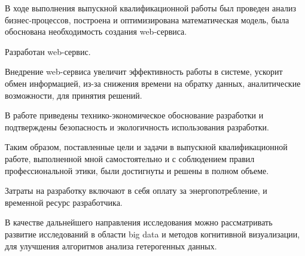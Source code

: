 В ходе выполнения выпускной квалификационной работы был проведен анализ бизнес-процессов, построена и оптимизирована математическая модель, была обоснована необходимость создания web-сервиса.

Разработан web-сервис.

Внедрение web-сервиса увеличит эффективность работы в системе, ускорит обмен информацией, из-за снижения времени на обратку данных, аналитические возможности, для принятия решений.

В работе приведены технико-экономическое обоснование разработки и подтверждены безопасность и экологичность использования разработки.

Таким образом, поставленные цели и задачи в выпускной квалификационной работе, выполненной мной самостоятельно и с соблюдением правил профессиональной этики, были достигнуты и решены в полном объеме.

Затраты на разработку включают в себя оплату за энергопотребление, и временной ресурс разработчика.   

В качестве дальнейшего направления исследования можно рассматривать развитие исследований в области big data и методов когнитивной визуализации, для улучшения алгоритмов анализа гетерогенных данных. %

\pagebreak